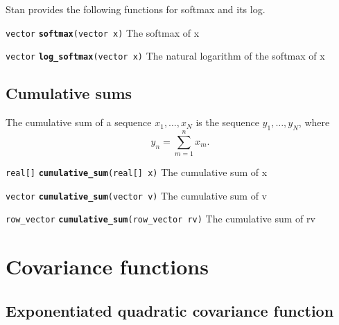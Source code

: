 \documentclass[
  10pt,
]{book}
\begin{document}
Stan provides the following functions for softmax and its log.


\texttt{vector} \textbf{\texttt{softmax}}\texttt{(vector\ x)}\newline
The softmax of x


\texttt{vector} \textbf{\texttt{log\_softmax}}\texttt{(vector\ x)}\newline
The natural logarithm of the softmax of x

\hypertarget{cumulative-sums}{%
\subsection{Cumulative sums}\label{cumulative-sums}}

The cumulative sum of a sequence \(x_1,\ldots,x_N\) is the sequence
\(y_1,\ldots,y_N\), where \[ y_n = \sum_{m = 1}^{n} x_m. \]


\texttt{real{[}{]}} \textbf{\texttt{cumulative\_sum}}\texttt{(real{[}{]}\ x)}\newline
The cumulative sum of x


\texttt{vector} \textbf{\texttt{cumulative\_sum}}\texttt{(vector\ v)}\newline
The cumulative sum of v


\texttt{row\_vector} \textbf{\texttt{cumulative\_sum}}\texttt{(row\_vector\ rv)}\newline
The cumulative sum of rv

\hypertarget{covariance}{%
\section{Covariance functions}\label{covariance}}

\hypertarget{exponentiated-quadratic-covariance-function}{%
\subsection{Exponentiated quadratic covariance function}\label{exponentiated-quadratic-covariance-function}}
\end{document}

